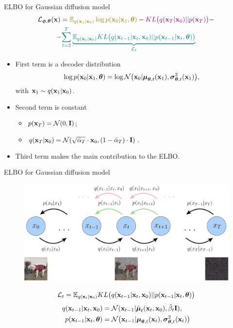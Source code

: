 \begin{frame}{ELBO for Gaussian diffusion model}
		\vspace{-0.5cm}
		\begin{multline*}
			\cL_{\bphi, \btheta}(\bx) =  {\color{olive}\bbE_{q(\bx_1 | \bx_0)} \log p(\bx_0 | \bx_1, \btheta)} - {\color{violet}KL\bigl(q(\bx_T | \bx_0) || p(\bx_T)\bigr)} - \\
			- {\color{teal}\sum_{t=2}^T \underbrace{ \bbE_{q(\bx_t | \bx_0)} KL \bigl(q(\bx_{t-1} | \bx_t, \bx_0) || p(\bx_{t - 1} | \bx_t, \btheta )\bigr)}_{\cL_t}}
		\end{multline*}
		\vspace{-0.5cm}
	\begin{itemize}
		\item {\color{olive}First term} is a decoder distribution
		\[
			\log p(\mathbf{x}_0 | \mathbf{x}_1, \boldsymbol{\theta}) = \log \mathcal{N} \bigl(\mathbf{x}_0 | \boldsymbol{\mu}_{\boldsymbol{\theta}, t}(\mathbf{x}_1), \boldsymbol{\sigma}_{\boldsymbol{\theta}, t}^2(\mathbf{x}_1)\bigr),
		\] 
		with $\mathbf{x}_1 \sim q(\mathbf{x}_1 | \mathbf{x}_0)$.
		\item {\color{violet}Second term} is constant 
		\begin{itemize}
			\item $p(\mathbf{x}_T) = \mathcal{N}(0, \mathbf{I})$;
			\item $q(\mathbf{x}_T | \mathbf{x}_0) = \mathcal{N}(\sqrt{\bar{\alpha}_T} \cdot \mathbf{x}_0, (1 - \bar{\alpha}_T) \cdot \mathbf{I})$.
		\end{itemize}
		\item {\color{teal}Third term} makes the main contribution to the ELBO.
	\end{itemize}
\end{frame}
\begin{frame}{ELBO for Gaussian diffusion model}
	\begin{figure}
		\includegraphics[width=\linewidth]{figs/diffusion_objective}
	\end{figure}
	\[
		\mathcal{L}_t = \mathbb{E}_{q(\mathbf{x}_t | \mathbf{x}_0)} KL \bigl(q(\mathbf{x}_{t-1} | \mathbf{x}_t, \mathbf{x}_0) || p(\mathbf{x}_{t - 1} | \mathbf{x}_t, \boldsymbol{\theta} )\bigr)
	\]
	\begin{align*}
		q(\mathbf{x}_{t-1} | \mathbf{x}_t, \mathbf{x}_0) &= \mathcal{N}(\mathbf{x}_{t-1} | \tilde{\boldsymbol{\mu}}_t(\mathbf{x}_t, \mathbf{x}_0), \tilde{\beta}_t \mathbf{I}), \\
		p(\mathbf{x}_{t - 1} | \mathbf{x}_t, \boldsymbol{\theta}) &= \mathcal{N} \bigl(\mathbf{x}_{t - 1} | \boldsymbol{\mu}_{\boldsymbol{\theta}, t}(\mathbf{x}_t), \boldsymbol{\sigma}_{\boldsymbol{\theta}, t}^2(\mathbf{x}_t)\bigr)
	\end{align*}
\end{frame}
